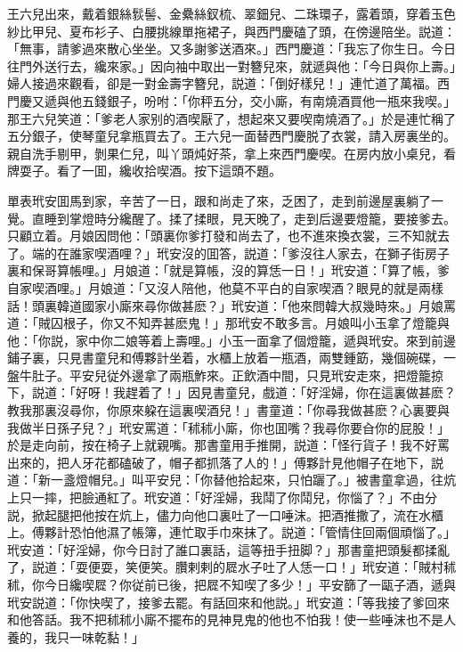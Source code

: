 王六兒出來，戴着銀絲䯼髻、金纍絲釵梳、翠鈿兒、二珠環子，露着頭，穿着玉色紗比甲兒、夏布衫子、白腰挑線單拖裙子，與西門慶磕了頭，在傍邊陪坐。説道：「無事，請爹過來散心坐坐。又多謝爹送酒來。」西門慶道：「我忘了你生日。今日往門外送行去，纔來家。」因向袖中取出一對簪兒來，就遞與他：「今日與你上壽。」婦人接過來觀看，卻是一對金壽字簪兒，説道：「倒好樣兒！」連忙道了萬福。西門慶又遞與他五錢銀子，吩咐：「你秤五分，交小廝，有南燒酒買他一瓶來我喫。」那王六兒笑道：「爹老人家别的酒喫厭了，想起來又要喫南燒酒了。」於是連忙稱了五分銀子，使琴童兒拿瓶買去了。王六兒一面替西門慶脱了衣裳，請入房裏坐的。親自洗手剔甲，剝果仁兒，叫丫頭炖好茶，拿上來西門慶喫。在房内放小桌兒，看牌耍子。看了一囬，纔收拾喫酒。按下這頭不題。

單表玳安囬馬到家，辛苦了一日，跟和尚走了來，乏困了，走到前邊屋裏躺了一覺。直睡到掌燈時分纔醒了。揉了揉眼，見天晚了，走到后邊要燈籠，要接爹去。只顧立着。月娘因問他：「頭裏你爹打發和尚去了，也不進來換衣裳，三不知就去了。端的在誰家喫酒哩？」玳安沒的囬答，説道：「爹沒往人家去，在獅子街房子裏和保哥算帳哩。」月娘道：「就是算帳，沒的算恁一日！」玳安道：「算了帳，爹自家喫酒哩。」月娘道：「又沒人陪他，他莫不平白的自家喫酒？眼見的就是兩樣話！頭裏韓道國家小廝來尋你做甚麽？」玳安道：「他來問韓大叔幾時來。」月娘罵道：「賊囚根子，你又不知弄甚麽鬼！」那玳安不敢多言。月娘叫小玉拿了燈籠與他：「你説，家中你二娘等着上壽哩。」小玉一面拿了個燈籠，遞與玳安。來到前邊鋪子裏，只見書童兒和傅夥計坐着，水櫃上放着一瓶酒，兩雙鍾筯，幾個碗碟，一盤牛肚子。平安兒従外邊拿了兩瓶鮓來。正飲酒中間，只見玳安走來，把燈籠掠下，説道：「好呀！我趕着了！」因見書童兒，戲道：「好淫婦，你在這裏做甚麽？教我那裏沒尋你，你原來躱在這裏喫酒兒！」書童道：「你尋我做甚麽？心裏要與我做半日孫子兒？」玳安罵道：「秫秫小廝，你也囬嘴？我尋你要㒲你的屁股！」於是走向前，按在椅子上就親嘴。那書童用手推開，説道：「怪行貨子！我不好罵出來的，把人牙花都磕破了，帽子都抓落了人的！」傅夥計見他帽子在地下，説道：「新一盞燈帽兒。」叫平安兒：「你替他拾起來，只怕躧了。」被書童拿過，往炕上只一摔，把臉通紅了。玳安道：「好淫婦，我鬦了你鬦兒，你惱了？」不由分説，掀起腿把他按在炕上，儘力向他口裏吐了一口唾沫。把酒推撒了，流在水櫃上。傅夥計恐怕他濕了帳簿，連忙取手巾來抹了。説道：「管情住回兩個頑惱了。」玳安道：「好淫婦，你今日討了誰口裏話，這等扭手扭脚？」那書童把頭髮都揉亂了，説道：「耍便耍，笑便笑。臢剌剌的㞞水子吐了人恁一口！」玳安道：「賊村秫秫，你今日纔喫㞞？你従前已後，把㞞不知喫了多少！」平安篩了一甌子酒，遞與玳安説道：「你快喫了，接爹去罷。有話回來和他説。」玳安道：「等我接了爹回來和他答話。我不把秫秫小廝不擺布的見神見鬼的他也不怕我！使一些唾沫也不是人養的，我只一味乾黏！」

